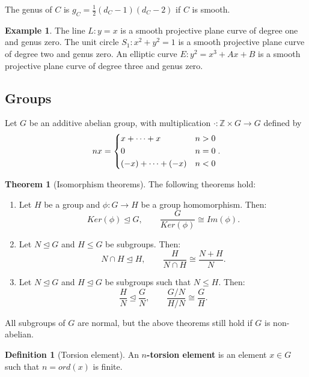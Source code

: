 \documentclass{article}
\newcommand{\Z}{\mathbb{Z}}
\newcommand{\rb}[1]{\left( #1 \right)}
\theoremstyle{definition}
\newtheorem*{definition}{Definition}
\newtheorem*{example}{Example}
\newtheorem{theorem}[proposition]{Theorem}
\begin{document}
The genus of $ C $ is $ g_C = \tfrac{1}{2}\rb{d_C - 1}\rb{d_C - 2} $ if $ C $ is smooth.

\begin{example}
The line $ L : y = x $ is a smooth projective plane curve of degree one and genus zero. The unit circle $ S_1 : x^2 + y^2 = 1 $ is a smooth projective plane curve of degree two and genus zero. An elliptic curve $ E : y^2 = x^3 + Ax + B $ is a smooth projective plane curve of degree three and genus zero.
\end{example}

\pagebreak

\subsection{Groups}

Let $ G $ be an additive abelian group, with multiplication $ \cdot : \Z \times G \to G $ defined by
$$ nx = \begin{dcases} x + \dots + x & n > 0 \\ 0 & n = 0 \\ \rb{-x} + \dots + \rb{-x} & n < 0 \end{dcases}. $$

\begin{theorem}[Isomorphism theorems]
The following theorems hold:
\begin{enumerate}
\item Let $ H $ be a group and $ \phi : G \to H $ be a group homomorphism. Then:
$$ Ker\rb{\phi} \trianglelefteq G, \qquad \dfrac{G}{Ker\rb{\phi}} \cong Im\rb{\phi}. $$
\item Let $ N \trianglelefteq G $ and $ H \le G $ be subgroups. Then:
$$ N \cap H \trianglelefteq H, \qquad \dfrac{H}{N \cap H} \cong \dfrac{N + H}{N}. $$
\item Let $ N \trianglelefteq G $ and $ H \trianglelefteq G $ be subgroups such that $ N \le H $. Then:
$$ \dfrac{H}{N} \trianglelefteq \dfrac{G}{N}, \qquad \dfrac{G / N}{H / N} \cong \dfrac{G}{H}. $$
\end{enumerate}
\end{theorem}

All subgroups of $ G $ are normal, but the above theorems still hold if $ G $ is non-abelian.

\begin{definition}[Torsion element]
An \textbf{$ n $-torsion element} is an element $ x \in G $ such that $ n = ord\rb{x} $ is finite.
\end{definition}
\end{document}
